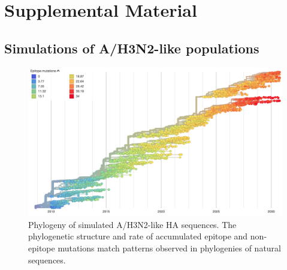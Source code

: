 \setcounter{figure}{0}
\setcounter{table}{0}
\renewcommand{\thefigure}{S\arabic{figure}}
\renewcommand{\thetable}{S\Roman{table}}

\section*{Supplemental Material}

\subsection*{Simulations of A/H3N2-like populations}

\begin{figure}[h]
  \begin{center}
  \includegraphics[width=\textwidth]{figures/simulated-h3n2-ha-phylogeny.png}
  \caption{Phylogeny of simulated A/H3N2-like HA sequences. The phylogenetic structure and rate of accumulated epitope and non-epitope mutations match patterns observed in phylogenies of natural sequences.}
  \label{sup_fig:simulated_h3n2_ha_phylogeny}
  \end{center}
\end{figure}
